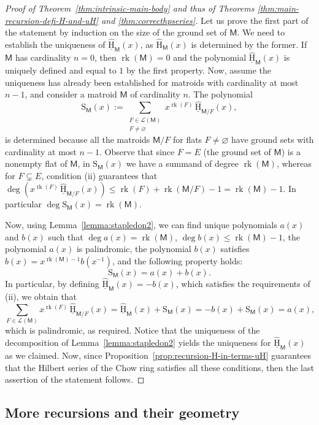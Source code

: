 \documentclass[11pt, a4paper, english]{amsart}
\theoremstyle{teoremas}
\theoremstyle{definition}
\DeclareMathOperator{\rk}{rk}
\newcommand{\M}{\mathsf{M}}
\renewcommand{\H}{\mathrm{H}}
\newcommand{\uH}{\underline{\mathrm{H}}}
\begin{document}
\begin{proof}[Proof of Theorem~\ref{thm:intrinsic-main-body} and thus of Theorems \ref{thm:main-recursion-defi-H-and-uH} and \ref{thm:correcthpseries}]
    Let us prove the first part of the statement by induction on the size of the ground set of $\M$. We need to establish the uniqueness of $\widehat{\uH}_{\M}(x)$, as $\widehat{\H}_{\M}(x)$ is determined by the former. If $\M$ has cardinality $n=0$, then $\rk(\M) = 0$ and the polynomial $\widehat{\uH}_{\M}(x)$ is uniquely defined and equal to $1$ by the first property. Now, assume the uniqueness has  already been established for matroids with cardinality at most $n-1$, and consider a matroid $\M$ of cardinality $n$. The polynomial
        \[ \mathrm{S}_\M(x) := \sum_{\substack{F\in\mathcal{L}(\M)\\F\neq\varnothing}} x^{\rk(F)}\,\widehat{\uH}_{\M/F}(x),\]
    is determined because all the matroids $\M/F$ for flats $F\neq\varnothing$ have ground sets with cardinality at most $n-1$. Observe that since $F=E$ (the ground set of $\M$) is a nonempty flat of $\M$, in $\mathrm{S}_{\M}(x)$ we have a summand of degree $\rk(\M)$, whereas for $F\subsetneq E$, condition (ii) guarantees that $\deg\left(x^{\rk(F)}\, \widehat{\uH}_{\M/F}(x)\right) \leq \rk(F) + \rk(\M/F) - 1 = \rk(\M) - 1$. In particular $\deg \mathrm{S}_{\M}(x) = \rk(\M)$. 
    
    Now, using Lemma~\ref{lemma:stapledon2}, we can find unique polynomials $a(x)$ and $b(x)$ such that $\deg a(x) = \rk(\M)$, $\deg b(x) \leq \rk(\M) - 1$, the polynomial $a(x)$ is palindromic, the polynomial $b(x)$ satisfies $b(x) = x^{\rk(\M)-1}b(x^{-1})$, and the following property holds:
        \[ \mathrm{S}_{\M}(x) = a(x) + b(x).\]
    In particular, by defining $\widehat{\uH}_{\M}(x) = -b(x)$, which satisfies the requirements of (ii), we obtain that
        \[ \sum_{F\in \mathcal{L}(\M)} x^{\rk(F)} \, \widehat{\uH}_{\M/F}(x) = \widehat{\uH}_{\M}(x) + \mathrm{S}_{\M}(x) = -b(x) + \mathrm{S}_{\M}(x) =  a(x),\]
    which is palindromic, as required. Notice that the uniqueness of the decomposition of Lemma~\ref{lemma:stapledon2} yields the uniqueness for $\widehat{\uH}_{\M}(x)$ as we claimed. Now, since Proposition~\ref{prop:recursion-H-in-terms-uH} guarantees that the Hilbert series of the Chow ring satisfies all these conditions, then the last assertion of the statement follows.
\end{proof}



\subsection{More recursions and their geometry}\label{subsec:self-rec-and-their-geometry}
\end{document}
